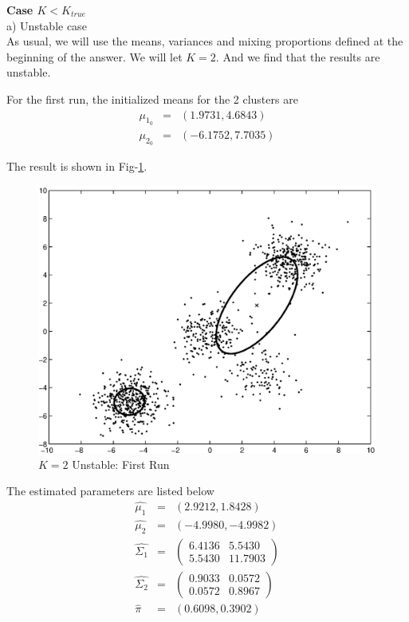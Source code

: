 \documentclass[12pt]{article}
\begin{document}
\textbf{Case $K < K_{true}$} \\

a) Unstable case \\

As usual, we will use the means, variances and mixing proportions defined at the beginning of the answer. We will let $K = 2$. And we find that the results are unstable.

For the first run, the initialized means for the 2 clusters are
\begin{eqnarray*}
\mu_{1_0} &=& (1.9731,    4.6843) \\
\mu_{2_0} &=& (-6.1752,    7.7035)
\end{eqnarray*}

The result is shown in Fig-\ref{fig:c3-1}. \\

\begin{figure}[ht!]
  \centering
  \includegraphics[width=0.7 \textwidth]{c3-1}
  \caption{$K = 2$ Unstable: First Run \label{fig:c3-1}}
\end{figure}

The estimated parameters are listed below
\begin{eqnarray*}
\hat{\mu_1} &=& (2.9212,    1.8428) \\
\hat{\mu_2} &=& (-4.9980,   -4.9982) \\
\hat{\Sigma_1} &=&
  \begin{pmatrix}
    6.4136  &  5.5430 \\
    5.5430  & 11.7903
  \end{pmatrix} \\
\hat{\Sigma_2} &=& 
  \begin{pmatrix}
    0.9033  &  0.0572 \\
    0.0572  &  0.8967
  \end{pmatrix} \\
\hat{\pi} &=& (0.6098, 0.3902)
\end{eqnarray*}
\end{document}
